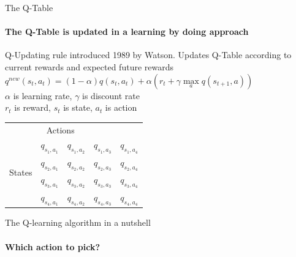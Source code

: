 \documentclass[color=usenames,dvipsnames]{beamer}
\begin{document}
\begin{frame}{The Q-Table}
\framesubtitle{The Q-Table is updated in a learning by doing approach}

Q-Updating rule introduced 1989 by Watson. Updates Q-Table according to current rewards and expected future rewards\\

$q^{new}(s_t,a_t)=(1-\alpha)q(s_t,a_t) + \alpha (r_t + \gamma \max\limits_{a} q(s_{t+1},a))$\\

$\alpha$ is learning rate, $\gamma$ is discount rate\\
$r_t$ is reward, $s_t$ is state, $a_t$ is action\\

\begin{table}
\begin{tabular}{lllll}
\multicolumn{4}{c}{Actions}\\
\multirow{4}{*}{States}		& $q_{s_1,a_1}$ & $q_{s_1,a_2}$ & $q_{s_1,a_3}$  & $q_{s_1,a_4}$\\
& $q_{s_2,a_1}$ & $q_{s_2,a_2}$ & $q_{s_2,a_3}$  & $q_{s_2,a_4}$\\
& $q_{s_3,a_1}$ & $q_{s_3,a_2}$ & $q_{s_3,a_3}$  & $q_{s_3,a_4}$\\
& $q_{s_4,a_1}$ & $q_{s_4,a_2}$ & $q_{s_4,a_3}$  & $q_{s_4,a_4}$\\
\end{tabular}
\end{table}

\end{frame}


\begin{frame}{The Q-learning algorithm in a nutshell}
\framesubtitle{Which action to pick?}
\end{frame}
\end{document}
